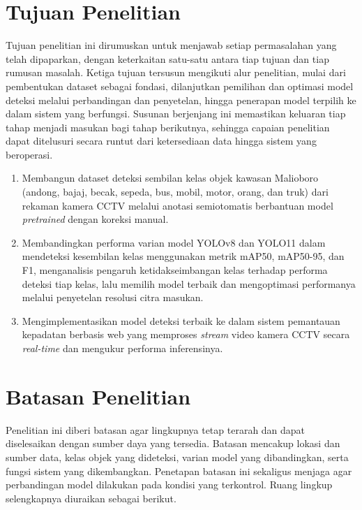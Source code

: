 \section{Tujuan Penelitian}

Tujuan penelitian ini dirumuskan untuk menjawab setiap permasalahan yang telah dipaparkan, 
dengan keterkaitan satu-satu antara tiap tujuan dan tiap rumusan masalah. Ketiga tujuan 
tersusun mengikuti alur penelitian, mulai dari pembentukan dataset sebagai fondasi, 
dilanjutkan pemilihan dan optimasi model deteksi melalui perbandingan dan penyetelan, 
hingga penerapan model terpilih ke dalam sistem yang berfungsi. Susunan berjenjang ini 
memastikan keluaran tiap tahap menjadi masukan bagi tahap berikutnya, sehingga capaian 
penelitian dapat ditelusuri secara runtut dari ketersediaan data hingga sistem yang 
beroperasi.

\begin{enumerate}
    \item Membangun dataset deteksi sembilan kelas objek kawasan Malioboro (andong, bajaj, becak, sepeda, bus, mobil, motor, orang, dan truk) dari rekaman kamera CCTV melalui anotasi semiotomatis berbantuan model \textit{pretrained} dengan koreksi manual.
    \item Membandingkan performa varian model YOLOv8 dan YOLO11 dalam mendeteksi kesembilan kelas menggunakan metrik mAP50, mAP50-95, dan F1, menganalisis pengaruh ketidakseimbangan kelas terhadap performa deteksi tiap kelas, lalu memilih model terbaik dan mengoptimasi performanya melalui penyetelan resolusi citra masukan.
    \item Mengimplementasikan model deteksi terbaik ke dalam sistem pemantauan kepadatan berbasis web yang memproses \textit{stream} video kamera CCTV secara \textit{real-time} dan mengukur performa inferensinya.
\end{enumerate}

\section{Batasan Penelitian}

Penelitian ini diberi batasan agar lingkupnya tetap terarah dan dapat diselesaikan 
dengan sumber daya yang tersedia. Batasan mencakup lokasi dan sumber data, kelas objek 
yang dideteksi, varian model yang dibandingkan, serta fungsi sistem yang dikembangkan. 
Penetapan batasan ini sekaligus menjaga agar perbandingan model dilakukan pada kondisi 
yang terkontrol. Ruang lingkup selengkapnya diuraikan sebagai berikut.

